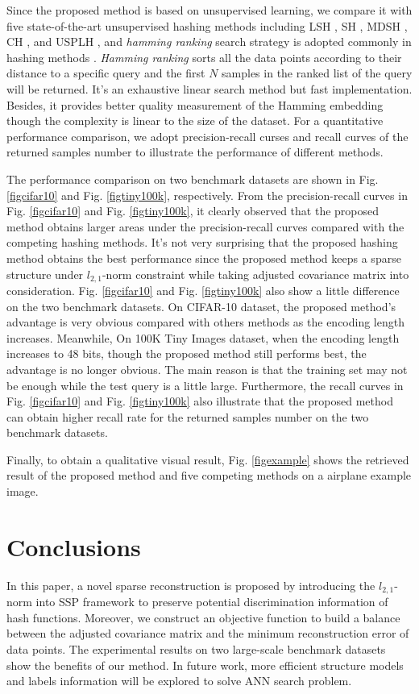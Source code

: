 \documentclass{sig-alternate}
\begin{document}
Since the proposed method is based on unsupervised learning, we compare it with five state-of-the-art unsupervised hashing methods including LSH \cite{DBLP:vldbGionisIM99-01}, SH \cite{DBLP:WeissTF08-09}, MDSH \cite{DBLP:eccvWeissFT12-10}, CH \cite{DBLP:iccvXuWLZLY11-12}, and USPLH \cite{DBLP:icmlWangKC10-15}, and \emph{hamming ranking} search strategy is adopted commonly in hashing methods \cite{DBLP:WangKC10-16,DBLP:WeissTF08-09,DBLP:cvprGongL11-11}. \emph{Hamming ranking} sorts all the data points according to their distance to a specific query and the first $N$ samples in the ranked list of the query will be returned. It's an exhaustive linear search method but fast implementation. Besides, it provides better quality measurement of the Hamming embedding though the complexity is linear to the size of the dataset. For a quantitative performance comparison, we adopt precision-recall curses and recall curves of the returned samples number to illustrate the performance of different methods.

The performance comparison on two benchmark datasets are shown in Fig. \ref{figcifar10} and Fig. \ref{figtiny100k}, respectively. From the precision-recall curves in Fig. \ref{figcifar10} and Fig. \ref{figtiny100k}, it clearly observed that the proposed method obtains larger areas under the precision-recall curves compared with the competing hashing methods. It's not very surprising that the proposed hashing method obtains the best performance since the proposed method keeps a sparse structure under $l_{2,1}$-norm constraint while taking adjusted covariance matrix into consideration. Fig. \ref{figcifar10} and Fig. \ref{figtiny100k} also show a little difference on the two benchmark datasets. On CIFAR-10 dataset, the proposed method's advantage is very obvious compared with others methods as the encoding length increases. Meanwhile, On 100K Tiny Images dataset, when the encoding length increases to 48 bits, though the proposed method still performs best, the advantage is no longer obvious. The main reason is that the training set may not be enough while the test query is a little large. Furthermore, the recall curves in Fig. \ref{figcifar10} and Fig. \ref{figtiny100k} also illustrate that the proposed method can obtain higher recall rate for the returned samples number on the two benchmark datasets.

Finally, to obtain a qualitative visual result, Fig. \ref{figexample} shows the retrieved  result of the proposed method and five competing methods on a airplane example image.
\section{Conclusions}
In this paper, a novel sparse reconstruction is proposed by introducing the $l_{2,1}$-norm into SSP framework to preserve potential discrimination information of hash functions. Moreover, we construct an objective function to build a balance between the adjusted covariance matrix and the minimum reconstruction error of data points. The experimental results on two large-scale benchmark datasets show the benefits of our method. In future work, more efficient structure models and labels information will be explored to solve ANN search problem.
\end{document}
